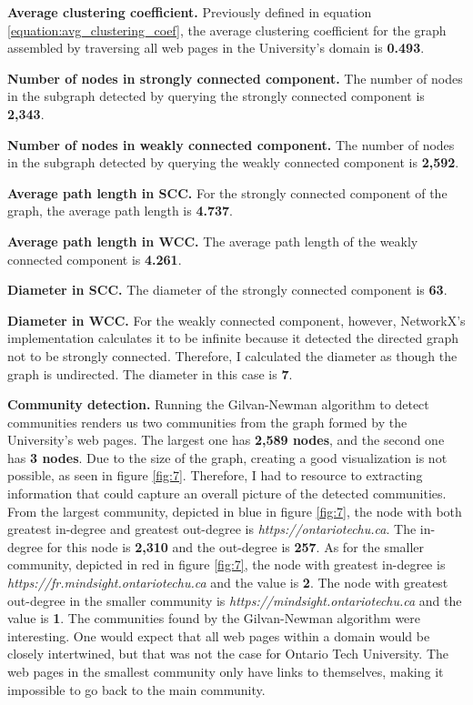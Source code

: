 \textbf{Average clustering coefficient.} Previously defined in equation \ref{equation:avg_clustering_coef}, the average clustering coefficient for the graph assembled by traversing all web pages in the University's domain is \textbf{0.493}.

\textbf{Number of nodes in strongly connected component.} The number of nodes in the subgraph detected by querying the strongly connected component is \textbf{2,343}.

\textbf{Number of nodes in weakly connected component.} The number of nodes in the subgraph detected by querying the weakly connected component is \textbf{2,592}.

\textbf{Average path length in SCC.} For the strongly connected component of the graph, the average path length is \textbf{4.737}.

\textbf{Average path length in WCC.} The average path length of the weakly connected component is \textbf{4.261}.

\textbf{Diameter in SCC.} The diameter of the strongly connected component is \textbf{63}.

\textbf{Diameter in WCC.} For the weakly connected component, however, NetworkX's implementation calculates it to be infinite because it detected the directed graph not to be strongly connected. Therefore, I calculated the diameter as though the graph is undirected. The diameter in this case is \textbf{7}.

\textbf{Community detection.} Running the Gilvan-Newman algorithm to detect communities renders us two communities from the graph formed by the University's web pages. The largest one has \textbf{2,589 nodes}, and the second one has \textbf{3 nodes}. Due to the size of the graph, creating a good visualization is not possible, as seen in figure \ref{fig:7}. Therefore, I had to resource to extracting information that could capture an overall picture of the detected communities. From the largest community, depicted in blue in figure \ref{fig:7}, the node with both greatest in-degree and greatest out-degree is \textit{https://ontariotechu.ca}. The in-degree for this node is \textbf{2,310} and the out-degree is \textbf{257}. As for the smaller community, depicted in red in figure \ref{fig:7}, the node with greatest in-degree is \textit{https://fr.mindsight.ontariotechu.ca} and the value is \textbf{2}. The node with greatest out-degree in the smaller community is \textit{https://mindsight.ontariotechu.ca} and the value is \textbf{1}. The communities found by the Gilvan-Newman algorithm were interesting. One would expect that all web pages within a domain would be closely intertwined, but that was not the case for Ontario Tech University. The web pages in the smallest community only have links to themselves, making it impossible to go back to the main community.


